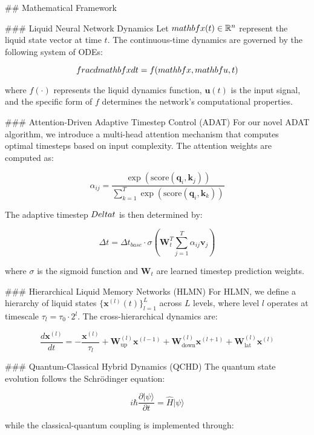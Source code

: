 ## Mathematical Framework

### Liquid Neural Network Dynamics
Let $\\mathbf{x}(t) \in \mathbb{R}^n$ represent the liquid state vector 
at time $t$. The continuous-time dynamics are governed by the following system of ODEs:

$$\\frac{d\\mathbf{x}}{dt} = f(\\mathbf{x}, \\mathbf{u}, t)$$

where $f(\cdot)$ represents the liquid dynamics function, $\mathbf{u}(t)$ is the input signal, 
and the specific form of $f$ determines the network's computational properties.

### Attention-Driven Adaptive Timestep Control (ADAT)
For our novel ADAT algorithm, we introduce a multi-head attention mechanism that computes 
optimal timesteps based on input complexity. The attention weights are computed as:

$$\alpha_{ij} = \frac{\exp(\text{score}(\mathbf{q}_i, \mathbf{k}_j))}{\sum_{k=1}^T \exp(\text{score}(\mathbf{q}_i, \mathbf{k}_k))}$$

The adaptive timestep $\\Delta t$ is then determined by:

$$\Delta t = \Delta t_{base} \cdot \sigma\left(\mathbf{W}_t^T \sum_{j=1}^T \alpha_{ij} \mathbf{v}_j\right)$$

where $\sigma$ is the sigmoid function and $\mathbf{W}_t$ are learned timestep prediction weights.

### Hierarchical Liquid Memory Networks (HLMN)
For HLMN, we define a hierarchy of liquid states $\{\mathbf{x}^{(l)}(t)\}_{l=1}^L$ across $L$ levels, 
where level $l$ operates at timescale $\tau_l = \tau_0 \cdot 2^l$. The cross-hierarchical dynamics are:

$$\frac{d\mathbf{x}^{(l)}}{dt} = -\frac{\mathbf{x}^{(l)}}{\tau_l} + \mathbf{W}_{\text{up}}^{(l)} \mathbf{x}^{(l-1)} + \mathbf{W}_{\text{down}}^{(l)} \mathbf{x}^{(l+1)} + \mathbf{W}_{\text{lat}}^{(l)} \mathbf{x}^{(l)}$$

### Quantum-Classical Hybrid Dynamics (QCHD)
The quantum state evolution follows the Schrödinger equation:

$$i\hbar \frac{\partial |\psi\rangle}{\partial t} = \hat{H} |\psi\rangle$$

while the classical-quantum coupling is implemented through:

